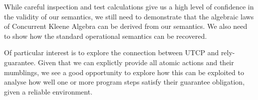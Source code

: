 
While careful inspection and test calculations
give us a high level of confidence in the validity of our semantics,
we still need to demonstrate that the algebraic laws
of Concurrent Kleene Algebra\cite{Hoare2009}
can be derived from our semantics.
We also need to show how the standard operational semantics can be recovered.

Of particular interest is to explore the connection
between UTCP and rely-guarantee.
Given that we can explictly provide all atomic actions and their mumblings,
we see a good opportunity to explore how this can be exploited
to analyse how well one or more program steps satisfy their
guarantee obligation, given a reliable environment.
